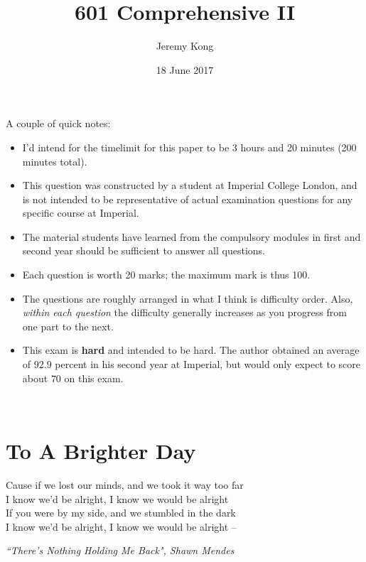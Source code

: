 \documentclass[12pt, a4paper]{article}
\title{601 Comprehensive II}
\author{Jeremy Kong}
\date{18 June 2017}
\begin{document}
\maketitle

\noindent A couple of quick notes:
\begin{itemize}
\item I'd intend for the timelimit for this paper to be 3 hours and 20 minutes (200 minutes total).
\item This question was constructed by a student at Imperial College London, and is not intended to be representative of actual examination questions for any specific course at Imperial.
\item The material students have learned from the compulsory modules in first and second year should be sufficient to answer all questions.
\item Each question is worth 20 marks; the maximum mark is thus 100.
\item The questions are roughly arranged in what I think is difficulty order. Also, \textit{within each question} the difficulty generally increases as you progress from one part to the next.
\item This exam is \textbf{hard} and intended to be hard. The author obtained an average of $92.9$ percent in his second year at Imperial, but would only expect to score about $70$ on this exam.
\end{itemize}

\newpage
$\:$
\newpage 

\section{To A Brighter Day}
\epigraph{Cause if we lost our minds, and we took it way too far \\
I know we'd be alright, I know we would be alright \\
If you were by my side, and we stumbled in the dark \\
I know we'd be alright, I know we would be alright --
}{\textit{``There's Nothing Holding Me Back", Shawn Mendes}}
\end{document}
